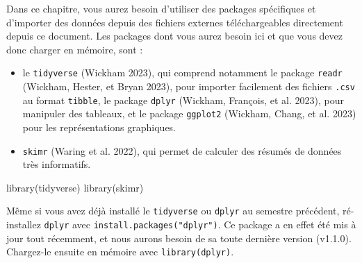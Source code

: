 \documentclass[
  a4paper,
  DIV=11,
  numbers=noendperiod,
  oneside]{scrreprt}
\newenvironment{Shaded}{}{}
\newcommand{\FunctionTok}[1]{\textcolor[rgb]{0.44,0.26,0.76}{#1}}
\newcommand{\NormalTok}[1]{\textcolor[rgb]{0.14,0.16,0.18}{#1}}
\providecommand{\tightlist}{%
  \setlength{\itemsep}{0pt}\setlength{\parskip}{0pt}}\usepackage{longtable,booktabs,array}
\begin{document}
Dans ce chapitre, vous aurez besoin d'utiliser des packages spécifiques
et d'importer des données depuis des fichiers externes téléchargeables
directement depuis ce document. Les packages dont vous aurez besoin ici
et que vous devez donc charger en mémoire, sont :

\begin{itemize}
\tightlist
\item
  le \texttt{tidyverse} (Wickham 2023), qui comprend notamment le
  package \texttt{readr} (Wickham, Hester, et Bryan 2023), pour importer
  facilement des fichiers \texttt{.csv} au format \texttt{tibble}, le
  package \texttt{dplyr} (Wickham, François, et al. 2023), pour
  manipuler des tableaux, et le package \texttt{ggplot2} (Wickham,
  Chang, et al. 2023) pour les représentations graphiques.
\item
  \texttt{skimr} (Waring et al. 2022), qui permet de calculer des
  résumés de données très informatifs.
\end{itemize}

\begin{Shaded}
\begin{Highlighting}[]
\FunctionTok{library}\NormalTok{(tidyverse)}
\FunctionTok{library}\NormalTok{(skimr)}
\end{Highlighting}
\end{Shaded}

\begin{tcolorbox}[enhanced jigsaw, breakable, toprule=.15mm, colbacktitle=quarto-callout-warning-color!10!white, colframe=quarto-callout-warning-color-frame, arc=.35mm, bottomtitle=1mm, opacityback=0, title=\textcolor{quarto-callout-warning-color}{\faExclamationTriangle}\hspace{0.5em}{Important}, bottomrule=.15mm, colback=white, toptitle=1mm, rightrule=.15mm, leftrule=.75mm, opacitybacktitle=0.6, left=2mm, titlerule=0mm, coltitle=black]

Même si vous avez déjà installé le \texttt{tidyverse} ou \texttt{dplyr}
au semestre précédent, ré-installez \texttt{dplyr} avec
\texttt{install.packages("dplyr")}. Ce package a en effet été mis à jour
tout récemment, et nous aurons besoin de sa toute dernière version
(v1.1.0). Chargez-le ensuite en mémoire avec \texttt{library(dplyr)}.

\end{tcolorbox}
\end{document}
